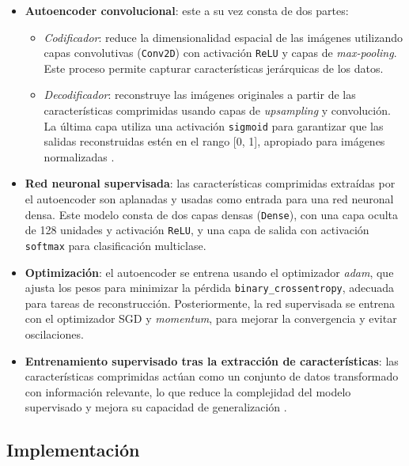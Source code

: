 \begin{itemize}
	\item \textbf{Autoencoder convolucional}: este a su vez consta de dos partes:
	\begin{itemize}
		\item \textit{Codificador}: reduce la dimensionalidad espacial de las imágenes utilizando capas convolutivas (\texttt{Conv2D}) con activación \texttt{ReLU} y capas de \textit{max-pooling}. Este proceso permite capturar características jerárquicas de los datos.
		\item \textit{Decodificador}: reconstruye las imágenes originales a partir de las características comprimidas usando capas de \textit{upsampling} y convolución. La última capa utiliza una activación \texttt{sigmoid} para garantizar que las salidas reconstruidas estén en el rango [0, 1], apropiado para imágenes normalizadas \parencite{vincent2010stacked}.
	\end{itemize}
	\item \textbf{Red neuronal supervisada}: las características comprimidas extraídas por el autoencoder son aplanadas y usadas como entrada para una red neuronal densa. Este modelo consta de dos capas densas (\texttt{Dense}), con una capa oculta de 128 unidades y activación \texttt{ReLU}, y una capa de salida con activación \texttt{softmax} para clasificación multiclase.
	\item \textbf{Optimización}: el autoencoder se entrena usando el optimizador \textit{adam}, que ajusta los pesos para minimizar la pérdida \texttt{binary\_crossentropy}, adecuada para tareas de reconstrucción. Posteriormente, la red supervisada se entrena con el optimizador SGD y \textit{momentum}, para mejorar la convergencia y evitar oscilaciones.
	\item \textbf{Entrenamiento supervisado tras la extracción de características}: las características comprimidas actúan como un conjunto de datos transformado con información relevante, lo que reduce la complejidad del modelo supervisado y mejora su capacidad de generalización \parencite{hinton2006reducing}.
\end{itemize}

\subsection{Implementación}

